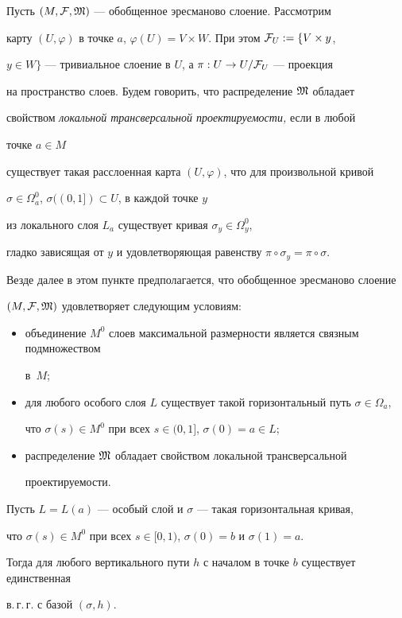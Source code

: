 Пусть $(M,{\cal F},\frak M)$ --- обобщенное эресманово слоение. Рассмотрим


карту $(U,\varphi)$ в точке $a$, $\varphi(U)=V\times W$. При этом ${\cal F}_U:=\{V\times y$,


$y\in W\}$ --- тривиальное слоение в $U$, а $\pi: U\to U/{\cal F}_U$ --- проекция


на пространство слоев. Будем говорить, что распределение  $\frak M$ обладает


свойством {\it локальной трансверсальной проектируемости,} если в любой


точке $a\in M$


существует такая расслоенная карта $(U,\varphi)$, что для произвольной кривой


$\sigma\in\Omega^0_a$, $\sigma ((0,1])\subset U$, в каждой точке $y$


из локального слоя $L_a$ существует кривая $\sigma_y\in\Omega^0_y$,


гладко зависящая от $y$ и удовлетворяющая равенству $\pi\circ\sigma_y=\pi\circ\sigma$.





Везде далее в этом пункте предполагается, что обобщенное эресманово слоение


$(M,{\cal F},\frak M)$ удовлетворяет следующим условиям:


\begin{itemize}


\item[$(C_0)$] объединение $M^0$ слоев максимальной размерности является связным подмножеством


в~$M$;


\item[$(C_1)$] для любого особого слоя $L$ существует такой горизонтальный путь $\sigma\in\Omega_a$,


что $\sigma(s)\in M^0$ при всех $s\in(0,1]$, $\sigma(0)=a\in L$;


\item[$(C_2)$] распределение  $\frak M$ обладает свойством локальной трансверсальной


проектируемости.


\end{itemize}





\begin{lem}\label{1}


Пусть $L=L(a)$ --- особый слой и $\sigma$ --- такая горизонтальная кривая,


что $\sigma(s)\in M^0$ при всех $s\in [0,1)$, $\sigma(0)=b$  и $\sigma(1)=a$.


Тогда для любого  вертикального пути $h$ с началом в точке $b$ существует единственная


в.\,г.\,г. с базой $(\sigma, h)$.


\end{lem}





